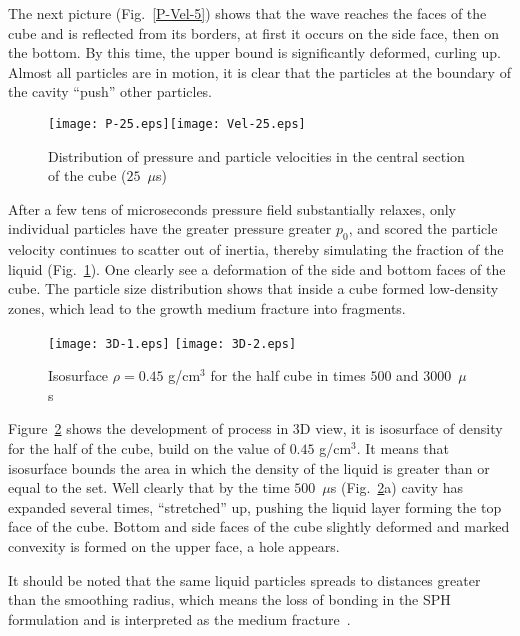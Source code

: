 \documentclass[a4paper]{jpconf}
\begin{document}
The next picture (Fig.~\ref{P-Vel-5}) shows that the wave reaches the faces of the cube and is reflected from its borders, at first it occurs on the side face, then on the bottom. By this time, the upper bound is significantly deformed, curling up. 
Almost all particles are in motion, it is clear that the particles at the boundary of the cavity ``push'' other particles.

\begin{figure}
\begin{center}
\texttt{[image: P-25.eps]}\texttt{[image: Vel-25.eps]}
\end{center}
\caption{\label{P-Vel-25} Distribution of pressure and particle velocities in the central section of the cube ($25$~$\mu$s)}
\end{figure}


After a few tens of microseconds pressure field substantially relaxes, only individual particles have the greater pressure greater $p_0$, and scored the particle velocity continues to scatter out of inertia, thereby simulating the fraction of the liquid (Fig.~\ref{P-Vel-25}). One clearly see a deformation of the side and bottom faces of the cube. The particle size distribution shows that inside a cube formed low-density zones, which lead to the growth medium fracture into fragments.

\begin{figure}
\begin{center}
\texttt{[image: 3D-1.eps]} \hfill \texttt{[image: 3D-2.eps]}
\end{center}
\caption{\label{3D-1} Isosurface $\rho=0.45$ g/cm$^3$ for the 
half cube in times $500$ and $3000$~$\mu$s}
\end{figure}

Figure~\ref{3D-1} shows 
the development of process in 3D view, it is isosurface of density for the half of the cube, build on the value of $0.45$ g/cm$^3$. It means  that isosurface bounds the area in which the density of the liquid is greater than or equal to the set. Well clearly that by the time $500$~$\mu$s (Fig.~\ref{3D-1}a) cavity has expanded several times, ``stretched'' up, pushing the liquid layer forming the top face of the cube. Bottom and side faces of the cube slightly deformed and marked convexity is formed on the upper face, a hole appears.


It should be noted that the same liquid particles spreads to distances greater than the smoothing radius, which means the loss of bonding in the SPH formulation and is interpreted as the medium fracture~\cite{DavydovKedrinskii2013}.
\end{document}
